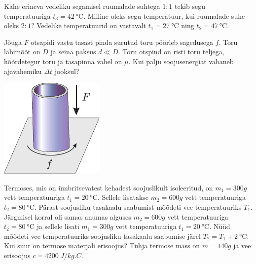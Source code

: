 \documentclass[10pt, twoside]{article}
\begin{document}
{
Kahe erineva vedeliku segamisel ruumalade suhtega $1 : 1$ tekib segu temperatuuriga $t_3 = \SI{42}{\degreeCelsius}$. Milline oleks segu temperatuur, kui ruumalade suhe oleks $2 : 1$? Vedelike temperatuurid on vastavalt $t_1 = \SI{27}{\degreeCelsius}$ ning $t_2 = \SI{47}{\degreeCelsius}$.
\probend
\bigskip


Jõuga $F$ otsapidi vastu tasast pinda surutud toru pöörleb sagedusega $f$. Toru läbimõõt on $D$ ja seina paksus $d \ll D$. Toru otspind on risti toru teljega, hõõrdetegur toru ja tasapinna vahel on $\mu$. Kui palju soojusenergiat vabaneb ajavahemiku $\Delta t$ jooksul?

\begin{center}
	\includegraphics[width=0.3\linewidth]{2008-v2g-03-yl}
\end{center}
\probend
\bigskip


Termoses, mis on ümbritsevatest kehadest soojuslikult isoleeritud, on $m_1 = \SI{300}g$ vett temperatuuriga $t_1 = \SI{20}{\degreeCelsius}$. Sellele lisatakse $m_2 = \SI{600}g$ vett temperatuuriga $t_2 = \SI{80}{\degreeCelsius}$. Pärast soojusliku
tasakaalu saabumist mõõdeti vee temperatuuriks $T_1$. Järgmisel korral oli
samas anumas alguses $m_2 = \SI{600}g$ vett temperatuuriga $t_2 = \SI{80}{\degreeCelsius}$ ja sellele lisati $m_1 = \SI{300}g$ vett temperatuuriga $t_1 = \SI{20}{\degreeCelsius}$. Nüüd mõõdeti vee temperatuuriks soojusliku tasakaalu saabumise järel $T_2 = T_1+\SI{2}{\degreeCelsius}$. Kui
suur on termose materjali erisoojus? Tühja termose mass on $m = \SI{140}g$ ja vee erisoojus $c = \SI{4200}{J/kg.C}$.
\probend
\bigskip


}
\end{document}
